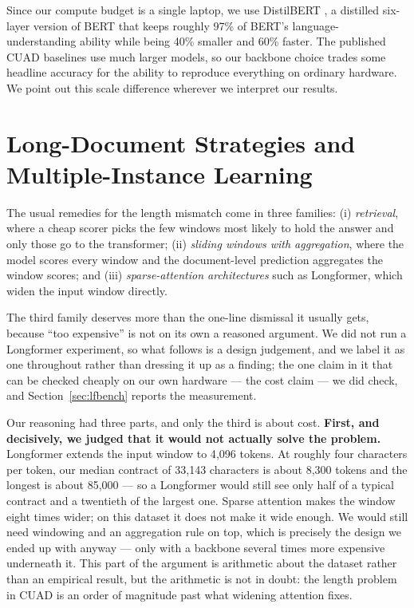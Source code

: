 Since our compute budget is a single laptop, we use DistilBERT \cite{sanh2019distilbert}, a distilled six-layer version of BERT that keeps roughly 97\% of BERT's language-understanding ability while being 40\% smaller and 60\% faster. The published CUAD baselines use much larger models, so our backbone choice trades some headline accuracy for the ability to reproduce everything on ordinary hardware. We point out this scale difference wherever we interpret our results.

\section{Long-Document Strategies and Multiple-Instance Learning}
\label{sec:lit_long}
The usual remedies for the length mismatch come in three families: (i) \emph{retrieval}, where a cheap scorer picks the few windows most likely to hold the answer and only those go to the transformer; (ii) \emph{sliding windows with aggregation}, where the model scores every window and the document-level prediction aggregates the window scores; and (iii) \emph{sparse-attention architectures} such as Longformer, which widen the input window directly.

The third family deserves more than the one-line dismissal it usually gets, because ``too expensive'' is not on its own a reasoned argument. We did not run a Longformer experiment, so what follows is a design judgement, and we label it as one throughout rather than dressing it up as a finding; the one claim in it that can be checked cheaply on our own hardware --- the cost claim --- we did check, and Section~\ref{sec:lfbench} reports the measurement.

Our reasoning had three parts, and only the third is about cost. \textbf{First, and decisively, we judged that it would not actually solve the problem.} Longformer extends the input window to 4{,}096 tokens. At roughly four characters per token, our median contract of 33{,}143 characters is about 8{,}300 tokens and the longest is about 85{,}000 --- so a Longformer would still see only half of a typical contract and a twentieth of the largest one. Sparse attention makes the window eight times wider; on this dataset it does not make it wide enough. We would still need windowing and an aggregation rule on top, which is precisely the design we ended up with anyway --- only with a backbone several times more expensive underneath it. This part of the argument is arithmetic about the dataset rather than an empirical result, but the arithmetic is not in doubt: the length problem in CUAD is an order of magnitude past what widening attention fixes.

